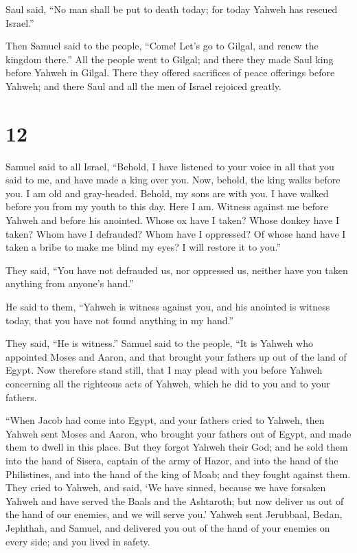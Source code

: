  Saul said, ``No man shall be put to death today; for
today Yahweh has rescued Israel.''

 Then Samuel said to the people, ``Come! Let's go to
Gilgal, and renew the kingdom there.''  All the people
went to Gilgal; and there they made Saul king before Yahweh in Gilgal.
There they offered sacrifices of peace offerings before Yahweh; and
there Saul and all the men of Israel rejoiced greatly.

\hypertarget{section-11}{%
\section{12}\label{section-11}}

 Samuel said to all Israel, ``Behold, I have listened to
your voice in all that you said to me, and have made a king over you.
 Now, behold, the king walks before you. I am old and
gray-headed. Behold, my sons are with you. I have walked before you from
my youth to this day.  Here I am. Witness against me
before Yahweh and before his anointed. Whose ox have I taken? Whose
donkey have I taken? Whom have I defrauded? Whom have I oppressed? Of
whose hand have I taken a bribe to make me blind my eyes? I will restore
it to you.''

 They said, ``You have not defrauded us, nor oppressed us,
neither have you taken anything from anyone's hand.''

 He said to them, ``Yahweh is witness against you, and his
anointed is witness today, that you have not found anything in my
hand.''

They said, ``He is witness.''  Samuel said to the people,
``It is Yahweh who appointed Moses and Aaron, and that brought your
fathers up out of the land of Egypt.  Now therefore stand
still, that I may plead with you before Yahweh concerning all the
righteous acts of Yahweh, which he did to you and to your fathers.

 ``When Jacob had come into Egypt, and your fathers cried
to Yahweh, then Yahweh sent Moses and Aaron, who brought your fathers
out of Egypt, and made them to dwell in this place.  But
they forgot Yahweh their God; and he sold them into the hand of Sisera,
captain of the army of Hazor, and into the hand of the Philistines, and
into the hand of the king of Moab; and they fought against them.
 They cried to Yahweh, and said, `We have sinned, because
we have forsaken Yahweh and have served the Baals and the Ashtaroth; but
now deliver us out of the hand of our enemies, and we will serve you.'
 Yahweh sent Jerubbaal, Bedan, Jephthah, and Samuel, and
delivered you out of the hand of your enemies on every side; and you
lived in safety.

